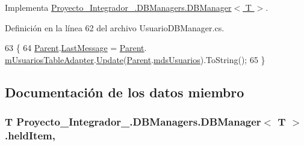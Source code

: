 Implementa \hyperlink{class_proyecto___integrador__3_1_1_d_b_managers_1_1_d_b_manager_3_01_t_01_4_aecafeb72fd4ce55d76c16c804e38dae8}{Proyecto\-\_\-\-Integrador\-\_.\-D\-B\-Managers.\-D\-B\-Manager$<$ T $>$}.



Definición en la línea 62 del archivo Usuario\-D\-B\-Manager.\-cs.


\begin{DoxyCode}
63             \{
64                 \hyperlink{class_proyecto___integrador__3_1_1_d_b_managers_1_1_d_b_manager_3_01_t_01_4_a06315e75298c8f2fd46f32dc7c9a80b2}{Parent}.\hyperlink{class_proyecto___integrador__3_1_1_d_b_managers_aecf2d3981e87f16c1e3a60c7913931a8}{LastMessage} = \hyperlink{class_proyecto___integrador__3_1_1_d_b_managers_1_1_d_b_manager_3_01_t_01_4_a06315e75298c8f2fd46f32dc7c9a80b2}{Parent}.
      \hyperlink{class_proyecto___integrador__3_1_1_d_b_managers_a8830e1bb507bcd7277966a4aabe3e830}{mUsuariosTableAdapter}.\hyperlink{class_proyecto___integrador__3_1_1ds_usuarios_table_adapters_1_1_usuarios_table_adapter_a0cb310a6346b919a7ac5717ea3225d0b}{Update}(\hyperlink{class_proyecto___integrador__3_1_1_d_b_managers_1_1_d_b_manager_3_01_t_01_4_a06315e75298c8f2fd46f32dc7c9a80b2}{Parent}.\hyperlink{class_proyecto___integrador__3_1_1_d_b_managers_a19d87c9abf32e08e2969847a008eb195}{mdsUsuarios}).ToString();
65             \}
\end{DoxyCode}


\subsection{Documentación de los datos miembro}
\hypertarget{class_proyecto___integrador__3_1_1_d_b_managers_1_1_d_b_manager_3_01_t_01_4_a3b67ae3b5b3b9c3793d56c1407d7dcff}{
\subsubsection[{held\-Item}]{\setlength{\rightskip}{0pt plus 5cm}T Proyecto\-\_\-\-Integrador\-\_.\-D\-B\-Managers.\-D\-B\-Manager$<$ T $>$.held\-Item\hspace{0.3cm}{\ttfamily [protected]}, {\ttfamily [inherited]}}}\label{class_proyecto___integrador__3_1_1_d_b_managers_1_1_d_b_manager_3_01_t_01_4_a3b67ae3b5b3b9c3793d56c1407d7dcff}



